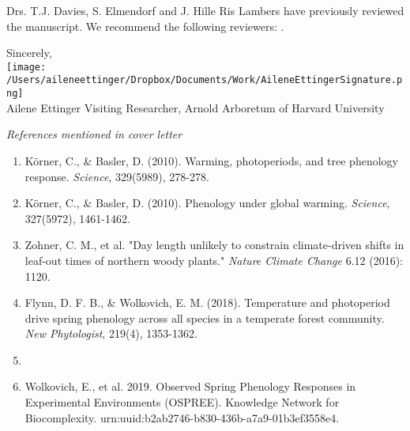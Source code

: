\documentclass[11pt,a4paper]{letter}
\begin{document}
\begin{letter}{}
Drs. T.J. Davies, S. Elmendorf and  J. Hille Ris Lambers have previously reviewed the manuscript. We recommend the following reviewers: .%

Sincerely,\\

\texttt{[image: /Users/aileneettinger/Dropbox/Documents/Work/AileneEttingerSignature.png]} \\
Ailene Ettinger
Visiting Researcher, Arnold Arboretum of Harvard University 

\noindent \emph{References mentioned in cover letter}
\begin{footnotesize}
\begin{enumerate}
\item K\"orner, C., \& Basler, D. (2010). Warming, photoperiods, and tree phenology response. \emph{Science}, 329(5989), 278-278.
\item K\"orner, C., \& Basler, D. (2010). Phenology under global warming. \emph{Science}, 327(5972), 1461-1462.
\item Zohner, C. M., et al. "Day length unlikely to constrain climate-driven shifts in leaf-out times of northern woody plants." \emph{Nature Climate Change} 6.12 (2016): 1120.
\item Flynn, D. F. B., \& Wolkovich, E. M. (2018). Temperature and photoperiod drive spring phenology across all species in a temperate forest community. \emph{New Phytologist}, 219(4), 1353-1362.
\item 
\item Wolkovich, E., et al. 2019. Observed Spring Phenology Responses in Experimental Environments (OSPREE). Knowledge Network for Biocomplexity. urn:uuid:b2ab2746-b830-436b-a7a9-01b3ef3558e4. 
\end{enumerate}
\end{footnotesize}



\end{letter}
\end{document}
